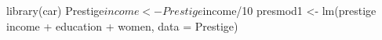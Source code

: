 \begin{Schunk}
\begin{Sinput}
 library(car)
 Prestige$income <- Prestige$income/10
 presmod1 <- lm(prestige ~ income + education + women, data = Prestige)
\end{Sinput}
\end{Schunk}
